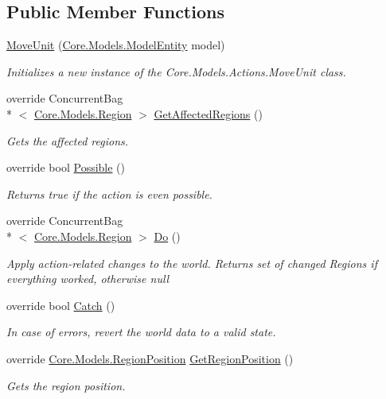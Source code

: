 \subsection*{Public Member Functions}
\begin{DoxyCompactItemize}
\item 
\hyperlink{classCore_1_1Controllers_1_1Actions_1_1MoveUnit_a323064ada90151bcd8d659ee27d87917}{Move\-Unit} (\hyperlink{classCore_1_1Models_1_1ModelEntity}{Core.\-Models.\-Model\-Entity} model)
\begin{DoxyCompactList}\small\item\em Initializes a new instance of the Core.\-Models.\-Actions.\-Move\-Unit class. \end{DoxyCompactList}\item 
override Concurrent\-Bag\\*
$<$ \hyperlink{classCore_1_1Models_1_1Region}{Core.\-Models.\-Region} $>$ \hyperlink{classCore_1_1Controllers_1_1Actions_1_1MoveUnit_a0331c4888d9efc148ecc501b4db37481}{Get\-Affected\-Regions} ()
\begin{DoxyCompactList}\small\item\em Gets the affected regions. \end{DoxyCompactList}\item 
override bool \hyperlink{classCore_1_1Controllers_1_1Actions_1_1MoveUnit_a6689af13f9a2f8ff90ad72d2ac327a52}{Possible} ()
\begin{DoxyCompactList}\small\item\em Returns true if the action is even possible. \end{DoxyCompactList}\item 
override Concurrent\-Bag\\*
$<$ \hyperlink{classCore_1_1Models_1_1Region}{Core.\-Models.\-Region} $>$ \hyperlink{classCore_1_1Controllers_1_1Actions_1_1MoveUnit_adaf6b91a2e858d8805ea8ed83947b27a}{Do} ()
\begin{DoxyCompactList}\small\item\em Apply action-\/related changes to the world. Returns set of changed Regions if everything worked, otherwise null \end{DoxyCompactList}\item 
override bool \hyperlink{classCore_1_1Controllers_1_1Actions_1_1MoveUnit_a80ff3497561ed98a933e41f48830d947}{Catch} ()
\begin{DoxyCompactList}\small\item\em In case of errors, revert the world data to a valid state. \end{DoxyCompactList}\item 
override \hyperlink{classCore_1_1Models_1_1RegionPosition}{Core.\-Models.\-Region\-Position} \hyperlink{classCore_1_1Controllers_1_1Actions_1_1MoveUnit_a87a9c5589011c8e86770e1b1be487381}{Get\-Region\-Position} ()
\begin{DoxyCompactList}\small\item\em Gets the region position. \end{DoxyCompactList}\end{DoxyCompactItemize}
